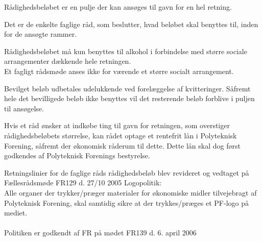 \begin{list}{•}
\item Rådighedsbeløbet er en pulje der kan ansøges til gavn for en hel retning.
\item Det er de enkelte faglige råd, som beslutter, hvad beløbet skal benyttes til, inden for de ansøgte rammer.
\item Rådighedsbeløbet må kun benyttes til alkohol i forbindelse med større sociale arrangementer dækkende hele retningen.\\
\hspace{20pt} Et fagligt rådsmøde anses ikke for værende et større socialt arrangement.
\item Bevilget beløb udbetales udelukkende ved forelæggelse af kvitteringer. Såfremt hele det bevilligede beløb ikke benyttes vil det resterende beløb forblive i puljen til ansøgelse.
\item Hvis et råd ønsker at indkøbe ting til gavn for retningen, som overstiger rådighedsbeløbets størrelse, kan rådet
optage et rentefrit lån i Polyteknisk Forening, såfremt der økonomisk råderum til dette. Dette lån skal dog først godkendes af Polyteknisk Forenings bestyrelse.
\end{list}
Retningslinier for de faglige råds rådighedsbeløb blev revideret og vedtaget på Fællesrådsmøde FR129 d. 27/10 2005
Logopolitik:\\
Alle organer der trykker/præger materialer for økonomiske midler tilvejebragt af Polyteknisk Forening, skal
samtidig sikre at der trykkes/præges et PF-logo på mediet.
\\
\\
Politiken er godkendt af FR på mødet FR139 d. 6. april 2006
